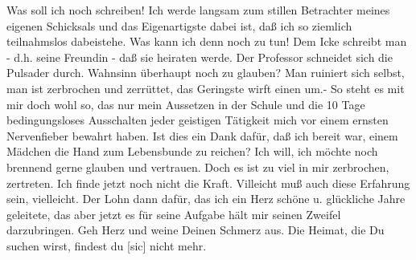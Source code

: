 \def\day{29. Mai 1944}
\mktitle

Was soll ich noch schreiben!
Ich werde langsam zum stillen Betrachter meines eigenen Schicksals und das Eigenartigste dabei ist, da{\ss} ich so ziemlich teilnahmslos dabeistehe.
Was kann ich denn noch zu tun!
Dem Icke schreibt man - d.h. seine Freundin - da{\ss} sie heiraten werde.
Der Professor schneidet sich die Pulsader durch.
Wahnsinn \"{u}berhaupt noch zu glauben?
Man ruiniert sich selbst, man ist zerbrochen und zerr\"{u}ttet, das Geringste wirft einen um.-
So steht es mit mir doch wohl so, das nur mein Aussetzen in der Schule und die 10 Tage bedingungsloses Ausschalten jeder geistigen T\"{a}tigkeit mich vor einem ernsten Nervenfieber bewahrt haben.
Ist dies ein Dank daf\"{u}r, da{\ss} ich bereit war, einem M\"{a}dchen die Hand zum Lebensbunde zu reichen?
Ich will, ich m\"{o}chte noch brennend gerne glauben und vertrauen.
Doch es ist zu viel in mir zerbrochen, zertreten.
Ich finde jetzt noch nicht die Kraft.
Villeicht mu{\ss} auch diese Erfahrung sein, vielleicht.
Der Lohn dann daf\"{u}r, das ich ein Herz sch\"{o}ne u. gl\"{u}ckliche Jahre geleitete, das aber jetzt es f\"{u}r seine Aufgabe h\"{a}lt mir seinen Zweifel darzubringen.
Geh Herz und weine Deinen Schmerz aus.
Die Heimat, die Du suchen wirst, findest du{\color{red} [sic] } nicht mehr.

\clearpage
